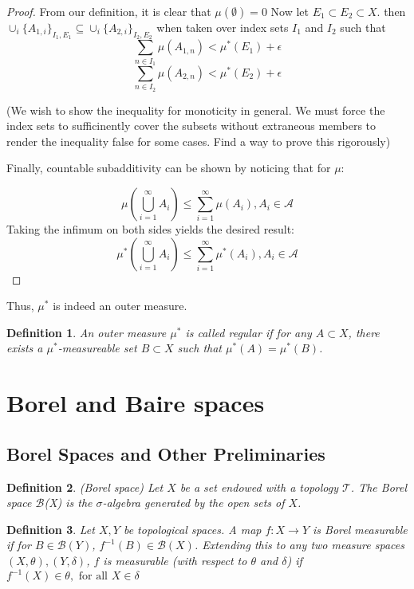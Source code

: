 \documentclass[12pt]{article}
\newtheorem{definition}{Definition}[section]
\theoremstyle{remark}
\begin{document}
\begin{proof}
From our definition, it is clear that $\mu(\emptyset) = 0$
\newline
Now let $E_1 \subset E_2 \subset X$.
then $\cup_i\{A_{1,i}\}_{I_1,E_1} \subseteq \cup_i\{A_{2,i}\}_{I_2,E_2}$ when taken over index sets $I_1$ and $I_2$
such that $$\sum_{n \in I_1} \mu(A_{1,n})  < \mu^*(E_1) + \epsilon$$
$$\sum_{n \in I_2} \mu(A_{2,n})  < \mu^*(E_2) +  \epsilon$$

(We wish to show the inequality for monoticity in general. We must force the index sets to sufficinently cover the subsets without extraneous members to render the inequality false for some cases. Find a way to prove this rigorously)

Finally, countable subadditivity can be shown by noticing that for $\mu$:

$$ \mu(\bigcup_{i = 1}^{\infty} A_i) \leq \sum_{i=1}^{\infty} \mu(A_i), A_i \in \mathcal{A} $$
Taking the infimum on both sides yields the desired result:
$$  \mu^*(\bigcup_{i = 1}^{\infty} A_i) \leq \sum_{i=1}^{\infty} \mu^*(A_i), A_i \in \mathcal{A} $$
\end{proof}

Thus, $\mu^*$ is indeed an outer measure.

\begin{definition}
An outer measure $\mu^*$ is called regular if for any $A \subset X$, there exists a $\mu^*$-measureable set $B \subset X$ such that $\mu^*(A) = \mu^*(B)$. 
\end{definition}

\section{Borel and Baire spaces}

\subsection{Borel Spaces and Other Preliminaries}

\begin{definition}(Borel space)
Let $X$ be a set endowed with a topology $\mathcal{T}$. The Borel space $\mathcal{B}$(X) is the $\sigma$-algebra generated by the open sets of $X$.
\end{definition}

\begin{definition}
Let $X,Y$ be topological spaces. A map $f: X \rightarrow Y$ is Borel measurable if for $B \in \mathcal{B}(Y)$, $f^{-1}(B) \in \mathcal{B}(X)$. Extending this to any two measure spaces $(X,\theta),(Y,\delta)$, $f$ is measurable (with respect to $\theta$ and $\delta$) if $f^{-1}(X) \in \theta, \text{ for all } X \in \delta $
\end{definition}
\end{document}
